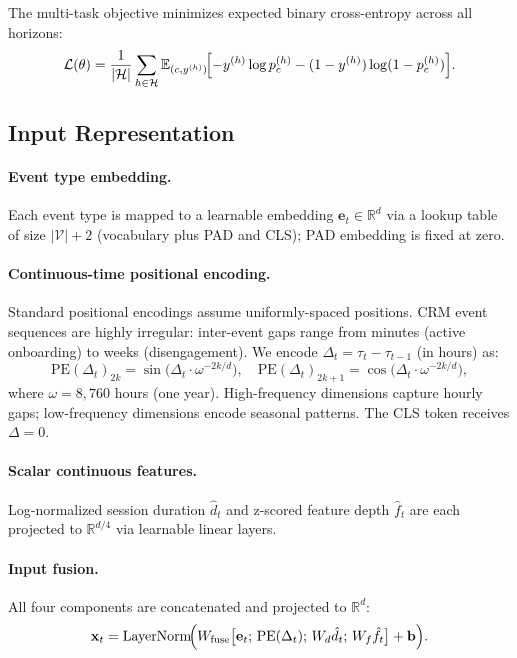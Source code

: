 \documentclass[review, 12pt]{elsarticle}
\newcommand{\R}{\mathbb{R}}
\begin{document}
The multi-task objective minimizes expected binary cross-entropy across all
horizons:
\begin{equation}
  \mathcal{L}(\theta) = \frac{1}{|\mathcal{H}|} \sum_{h \in \mathcal{H}}
    \mathbb{E}_{(c, y^{(h)})}
    \!\Bigl[-y^{(h)} \log p_c^{(h)} - (1-y^{(h)}) \log(1-p_c^{(h)})\Bigr].
  \label{eq:loss}
\end{equation}

\subsection{Input Representation}
\label{sec:input}

\paragraph{Event type embedding.}
Each event type is mapped to a learnable embedding $\mathbf{e}_t \in \R^{d}$
via a lookup table of size $|\mathcal{V}| + 2$ (vocabulary plus PAD and CLS);
PAD embedding is fixed at zero.

\paragraph{Continuous-time positional encoding.}
Standard positional encodings assume uniformly-spaced positions.
CRM event sequences are highly irregular: inter-event gaps range from minutes
(active onboarding) to weeks (disengagement).
We encode $\Delta_t = \tau_t - \tau_{t-1}$ (in hours) as:
\begin{equation}
  \text{PE}(\Delta_t)_{2k}   = \sin\!\bigl(\Delta_t \cdot \omega^{-2k/d}\bigr),
  \quad
  \text{PE}(\Delta_t)_{2k+1} = \cos\!\bigl(\Delta_t \cdot \omega^{-2k/d}\bigr),
  \label{eq:pe}
\end{equation}
where $\omega = 8{,}760$ hours (one year).
High-frequency dimensions capture hourly gaps; low-frequency dimensions encode
seasonal patterns.
The CLS token receives $\Delta = 0$.

\paragraph{Scalar continuous features.}
Log-normalized session duration $\hat{d}_t$ and z-scored feature depth
$\hat{f}_t$ are each projected to $\R^{d/4}$ via learnable linear layers.

\paragraph{Input fusion.}
All four components are concatenated and projected to $\R^d$:
\begin{equation}
  \mathbf{x}_t = \text{LayerNorm}\!\Bigl(
    W_{\text{fuse}}\bigl[\mathbf{e}_t;\,\text{PE}(\Delta_t);\,
    W_d\hat{d}_t;\,W_f\hat{f}_t\bigr] + \mathbf{b}\Bigr).
  \label{eq:fusion}
\end{equation}
\end{document}
